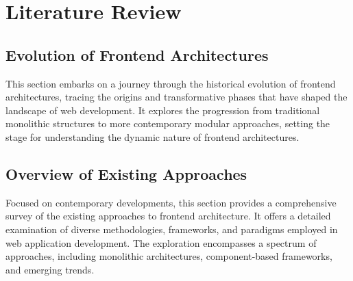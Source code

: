 \chapter{Literature Review}
\label{chap:Literature-Review} 

\section{Evolution of Frontend Architectures}
This section embarks on a journey through the historical evolution of frontend architectures, tracing the origins and transformative phases that have shaped the landscape of web development. It explores the progression from traditional monolithic structures to more contemporary modular approaches, setting the stage for understanding the dynamic nature of frontend architectures.

\section{Overview of Existing Approaches}
Focused on contemporary developments, this section provides a comprehensive survey of the existing approaches to frontend architecture. It offers a detailed examination of diverse methodologies, frameworks, and paradigms employed in web application development. The exploration encompasses a spectrum of approaches, including monolithic architectures, component-based frameworks, and emerging trends.